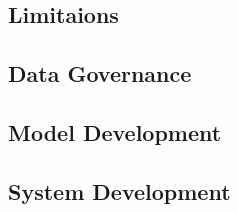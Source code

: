 \subsection{Limitaions}


\subsection{Data Governance}


\subsection{Model Development}


\subsection{System Development}
\label{sec:sys_dev}
